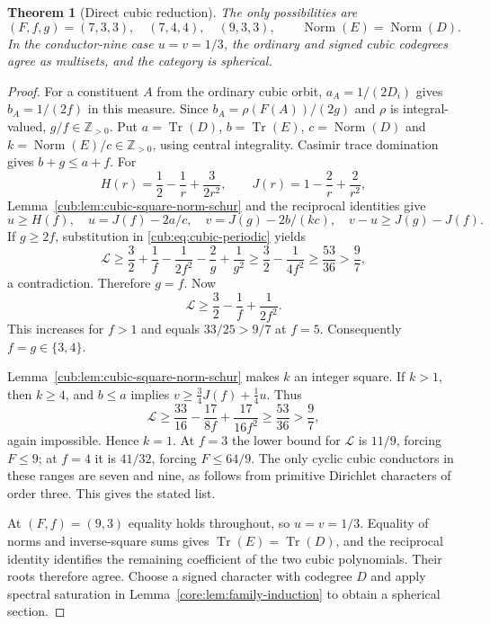\documentclass[11pt,a4paper]{article}
\newtheorem{theorem}{Theorem}[section]
\theoremstyle{definition}\newtheorem{definition}[theorem]{Definition}
\theoremstyle{remark}\newtheorem{remark}[theorem]{Remark}
\newcommand{\ZZ}{\mathbb Z}
\numberwithin{equation}{section}
\begin{document}
\begin{theorem}[Direct cubic reduction]\label{cub:thm:cubic-reduction}
The only possibilities are
\[
 (F,f,g)=(7,3,3),\quad(7,4,4),\quad(9,3,3),
 \qquad \operatorname{Norm}(E)=\operatorname{Norm}(D).
\]
In the conductor-nine case $u=v=1/3$, the ordinary and signed cubic
codegrees agree as multisets, and the category is spherical.
\end{theorem}
\begin{proof}
For a constituent $A$ from the ordinary cubic orbit,
$a_A=1/(2D_i)$ gives $b_A=1/(2f)$ in this measure.
Since $b_A=\rho(F(A))/(2g)$ and $\rho$ is integral-valued,
$g/f\in\ZZ_{>0}$.
Put $a=\operatorname{Tr}(D)$, $b=\operatorname{Tr}(E)$,
$c=\operatorname{Norm}(D)$ and
$k=\operatorname{Norm}(E)/c\in\ZZ_{>0}$, using central
integrality. Casimir trace domination gives $b+g\le a+f$.
For
\[
 H(r)=\frac12-\frac1r+\frac{3}{2r^2},\qquad
 J(r)=1-\frac2r+\frac2{r^2},
\]
Lemma~\ref{cub:lem:cubic-square-norm-schur} and the reciprocal
identities give
\[
 u\ge H(f),\quad u=J(f)-2a/c,\quad v=J(g)-2b/(kc),
 \quad v-u\ge J(g)-J(f).
\]
If $g\ge2f$, substitution in \eqref{cub:eq:cubic-periodic} yields
\[
 \mathcal L\ge\frac32+\frac1f-\frac1{2f^2}-\frac2g+\frac1{g^2}
 \ge\frac32-\frac1{4f^2}\ge\frac{53}{36}>\frac97,
\]
a contradiction. Therefore $g=f$. Now
\[
 \mathcal L\ge\frac32-\frac1f+\frac1{2f^2}.
\]
This increases for $f>1$ and equals $33/25>9/7$ at $f=5$.
Consequently $f=g\in\{3,4\}$.

Lemma~\ref{cub:lem:cubic-square-norm-schur} makes $k$ an integer
square. If $k>1$, then $k\ge4$, and $b\le a$ implies
$v\ge\tfrac34J(f)+\tfrac14u$. Thus
\[
 \mathcal L\ge\frac{33}{16}-\frac{17}{8f}+\frac{17}{16f^2}
 \ge\frac{53}{36}>\frac97,
\]
again impossible. Hence $k=1$.
At $f=3$ the lower bound for $\mathcal L$ is $11/9$, forcing
$F\le9$; at $f=4$ it is $41/32$, forcing $F\le64/9$.
The only cyclic cubic conductors in these ranges are seven and nine,
as follows from primitive Dirichlet characters of order three.
This gives the stated list.

At $(F,f)=(9,3)$ equality holds throughout, so $u=v=1/3$.
Equality of norms and inverse-square sums gives
$\operatorname{Tr}(E)=\operatorname{Tr}(D)$, and the reciprocal
identity identifies the remaining coefficient of the two cubic
polynomials. Their roots therefore agree. Choose a signed character
with codegree $D$ and apply spectral saturation in
Lemma~\ref{core:lem:family-induction} to obtain a spherical section.
\end{proof}
\end{document}
